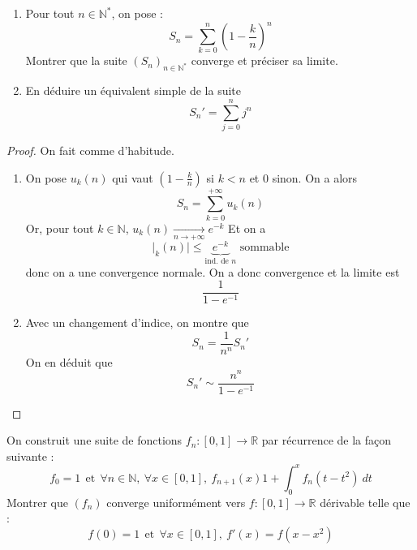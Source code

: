 \documentclass[french,a4paper]{article}
\newcommand{\N}{\mathbb{N}}
\newcommand{\R}{\mathbb{R}}
\newcommand{\st}{^*}
\theoremstyle{plain}
\theoremstyle{definition}
\theoremstyle{remark}
\begin{document}
\begin{ex}{}
	\begin{enumerate}
		\item Pour tout $n\in\N\st$, on pose : $$S_n=\sum_{k=0}^{n}\left(1-\frac{k}{n}\right)^n$$ Montrer que la suite $(S_n)_{n\in\N\st}$ converge et préciser sa limite.
		\item En déduire un équivalent simple de la suite $$S_n'=\sum_{j=0}^{n}j^n$$
	\end{enumerate}
\end{ex}
\begin{proof}
	On fait comme d'habitude.
	\begin{enumerate}
		\item On pose $u_k(n)$ qui vaut $\displaystyle\left(1-\frac{k}{n}\right)$ si $k<n$ et $0$ sinon. On a alors $$S_n=\sum_{k=0}^{+\infty}u_k(n)$$ Or, pour tout $k\in\N$, $u_k(n)\xrightarrow[n\to+\infty]{}e^{-k}$ Et on a $$\lvert _k(n)\rvert\leqslant \underbrace{e^{-k}}_{\text{ind. de }n}\text{ sommable}$$ donc on a une convergence normale. On a donc convergence et la limite est $$\frac{1}{1-e^{-1}}$$
		\item Avec un changement d'indice, on montre que $$S_n=\frac{1}{n^n}S_n'$$ On en déduit que $$S_n'\sim\frac{n^n}{1-e^{-1}}$$
	\end{enumerate}
\end{proof}

\begin{ex}{}
	On construit une suite de fonctions $f_n:[0,1]\to\R$ par récurrence de la façon suivante : $$f_0=1\ \ \text{et}\ \ \forall n\in\N,\ \forall x\in[0,1],\ f_{n+1}(x)1+\int_{0}^{x}f_n(t-t^2)\ dt$$ Montrer que $(f_n)$ converge uniformément vers $f:[0,1]\to\R$ dérivable telle que : $$f(0)=1 \ \ \text{et}\ \ \forall x\in[0,1],\ f'(x)=f(x-x^2)$$
\end{ex}
\end{document}

